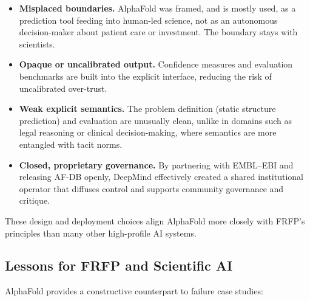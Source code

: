 \begin{itemize}
  \item \textbf{Misplaced boundaries.}
        AlphaFold was framed, and is mostly used, as a prediction tool feeding
        into human-led science, not as an autonomous decision-maker about
        patient care or investment. The boundary stays with scientists.
  \item \textbf{Opaque or uncalibrated output.}
        Confidence measures and evaluation benchmarks are built into the
        explicit interface, reducing the risk of uncalibrated over-trust.
  \item \textbf{Weak explicit semantics.}
        The problem definition (static structure prediction) and evaluation
        are unusually clean, unlike in domains such as legal reasoning or
        clinical decision-making, where semantics are more entangled with tacit
        norms.
  \item \textbf{Closed, proprietary governance.}
        By partnering with EMBL–EBI and releasing AF-DB openly, DeepMind
        effectively created a shared institutional operator that diffuses
        control and supports community governance and critique.
\end{itemize}

These design and deployment choices align AlphaFold more closely with FRFP’s
principles than many other high-profile AI systems.

\subsection{Lessons for FRFP and Scientific AI}

AlphaFold provides a constructive counterpart to failure case studies:

